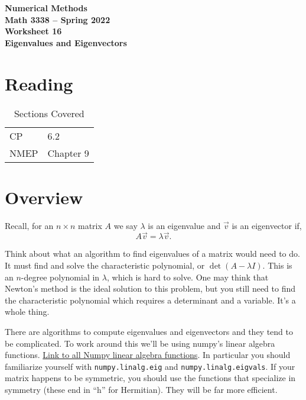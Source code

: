 \documentclass[11pt,letterpaper]{article}
\newcommand{\semester}{Spring 2022}
\begin{document}
\begin{center}
{\huge{\bf  Numerical Methods}} \\[1.5ex]
{\bf Math 3338 -- \semester}\\[1.5ex]
{\Large{\bf Worksheet 16\ \\[2ex] Eigenvalues and Eigenvectors}}\\
\end{center}
\vspace{2mm}


\section{Reading}

\begin{table}[!ht]
 \centering
 \begin{tabular}{ll}
   CP &  6.2 \\
 NMEP &  Chapter 9
 \end{tabular}
\caption{Sections Covered}
\end{table}

\section{Overview}

Recall, for an $n\times n$ matrix $A$ we say $\lambda$ is an eigenvalue and $\vec{v}$ is an
eigenvector if,
\[
A\vec{v} = \lambda \vec{v}.
\]

Think about what an algorithm to find eigenvalues of a matrix would need to do. It must find and solve the characteristic polynomial, or $\det(A-\lambda I)$. This is an $n$-degree polynomial in $\lambda$, which is hard to solve. One may think that Newton's method is the ideal solution to this problem, but you still need to find the characteristic polynomial which requires a determinant and a variable. It's a whole thing.  

There are algorithms to compute eigenvalues and eigenvectors and they tend to be complicated. To work around this we'll be using numpy's linear algebra functions. \href{https://docs.scipy.org/doc/numpy/reference/routines.linalg.html}{Link to all Numpy linear algebra functions}. In particular you should familiarize yourself with \texttt{numpy.linalg.eig} and \texttt{numpy.linalg.eigvals}. If your matrix happens to be symmetric, you should use the functions that specialize in symmetry (these end in ``h'' for Hermitian). They will be far more efficient. 
\end{document}
